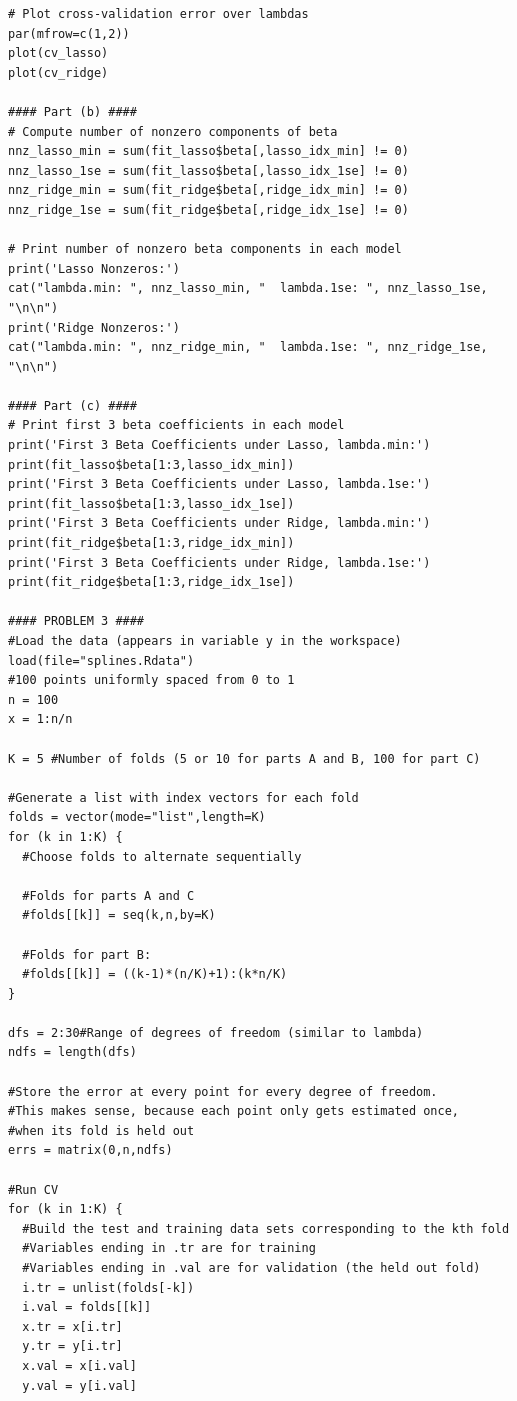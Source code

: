 \documentclass[12pt]{article}
\newcommand{\1}{\mathbbm{1}}
\begin{document}
\begin{verbatim}
# Plot cross-validation error over lambdas
par(mfrow=c(1,2))
plot(cv_lasso)
plot(cv_ridge)

#### Part (b) ####
# Compute number of nonzero components of beta
nnz_lasso_min = sum(fit_lasso$beta[,lasso_idx_min] != 0)
nnz_lasso_1se = sum(fit_lasso$beta[,lasso_idx_1se] != 0)
nnz_ridge_min = sum(fit_ridge$beta[,ridge_idx_min] != 0)
nnz_ridge_1se = sum(fit_ridge$beta[,ridge_idx_1se] != 0)

# Print number of nonzero beta components in each model
print('Lasso Nonzeros:')
cat("lambda.min: ", nnz_lasso_min, "  lambda.1se: ", nnz_lasso_1se, "\n\n")
print('Ridge Nonzeros:')
cat("lambda.min: ", nnz_ridge_min, "  lambda.1se: ", nnz_ridge_1se, "\n\n")

#### Part (c) ####
# Print first 3 beta coefficients in each model
print('First 3 Beta Coefficients under Lasso, lambda.min:')
print(fit_lasso$beta[1:3,lasso_idx_min])
print('First 3 Beta Coefficients under Lasso, lambda.1se:')
print(fit_lasso$beta[1:3,lasso_idx_1se])
print('First 3 Beta Coefficients under Ridge, lambda.min:')
print(fit_ridge$beta[1:3,ridge_idx_min])
print('First 3 Beta Coefficients under Ridge, lambda.1se:')
print(fit_ridge$beta[1:3,ridge_idx_1se])

#### PROBLEM 3 ####
#Load the data (appears in variable y in the workspace)
load(file="splines.Rdata")
#100 points uniformly spaced from 0 to 1
n = 100
x = 1:n/n

K = 5 #Number of folds (5 or 10 for parts A and B, 100 for part C)

#Generate a list with index vectors for each fold
folds = vector(mode="list",length=K)
for (k in 1:K) {
  #Choose folds to alternate sequentially
  
  #Folds for parts A and C
  #folds[[k]] = seq(k,n,by=K) 
  
  #Folds for part B:
  #folds[[k]] = ((k-1)*(n/K)+1):(k*n/K)
}

dfs = 2:30#Range of degrees of freedom (similar to lambda)
ndfs = length(dfs)

#Store the error at every point for every degree of freedom.
#This makes sense, because each point only gets estimated once,
#when its fold is held out
errs = matrix(0,n,ndfs)

#Run CV
for (k in 1:K) {
  #Build the test and training data sets corresponding to the kth fold
  #Variables ending in .tr are for training
  #Variables ending in .val are for validation (the held out fold)
  i.tr = unlist(folds[-k])
  i.val = folds[[k]]
  x.tr = x[i.tr]    
  y.tr = y[i.tr]   
  x.val = x[i.val] 
  y.val = y[i.val]
  

\end{verbatim}
\end{document}

